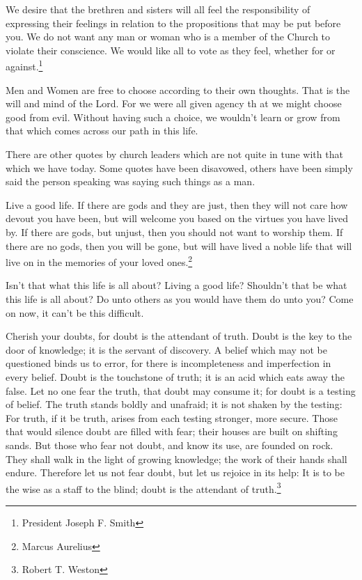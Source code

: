 \begin{displayquote}
We desire that the brethren and sisters will all feel the responsibility of 
expressing their feelings in relation to the propositions that may be put 
before you. We do not want any man or woman who is a member of the Church to 
violate their conscience. We would like all to vote as they feel, whether for 
or against.\footnote{President Joseph F. Smith}
\end{displayquote}

Men and Women are free to choose according to their own thoughts. That is the 
will and mind of the Lord. For we were all given agency th at we might choose 
good from evil. Without having such a choice, we wouldn't learn or grow from 
that which comes across our path in this life.

There are other quotes by church leaders which are not quite in tune with that 
which we have today. Some quotes have been disavowed, others have been simply 
said the person speaking was saying such things as a man.

\begin{displayquote}
Live a good life. If there are gods and they are just, then they will not care 
how devout you have been, but will welcome you based on the virtues you have 
lived by. If there are gods, but unjust, then you should not want to worship 
them. If there are no gods, then you will be gone, but will have lived a noble 
life that will live on in the memories of your loved ones.\footnote{
Marcus Aurelius}
\end{displayquote}

Isn't that what this life is all about? Living a good life? Shouldn't that be
what this life is all about? Do unto others as you would have them do unto you?
Come on now, it can't be this difficult.

\begin{displayquote}
Cherish your doubts, for doubt is the attendant of truth. Doubt is the key to the
door of knowledge; it is the servant of discovery. A belief which may not be
questioned binds us to error, for there is incompleteness and imperfection in every
belief. Doubt is the touchstone of truth; it is an acid which eats away the false.
Let no one fear the truth, that doubt may consume it; for doubt is a testing of
belief. The truth stands boldly and unafraid; it is not shaken by the testing:
For truth, if it be truth, arises from each testing stronger, more secure. Those
that would silence doubt are filled with fear; their houses are built on shifting
sands. But those who fear not doubt, and know its use, are founded on rock.
They shall walk in the light of growing knowledge; the work of their hands shall
endure. Therefore let us not fear doubt, but let us rejoice in its help: It is to be
the wise as a staff to the blind; doubt is the attendant of truth.\footnote{
Robert T. Weston}
\end{displayquote}

